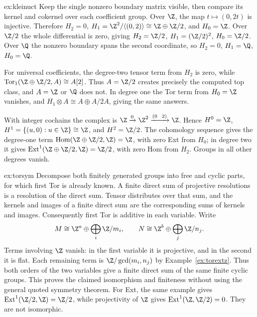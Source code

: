 \begin{solution}{ex:kleinuct}
\idea Keep the single nonzero boundary matrix visible, then compare its kernel and cokernel over each coefficient group.
\writeup Over $\Z$, the map $t\mapsto(0,2t)$ is injective. Therefore
$H_2=0$, $H_1=\Z^2/\langle(0,2)\rangle\cong\Z\oplus\Z/2$, and $H_0=\Z$.
Over $\Z/2$ the whole differential is zero, giving $H_2=\Z/2$, $H_1=(\Z/2)^2$, $H_0=\Z/2$.
Over $\Q$ the nonzero boundary spans the second coordinate, so $H_2=0$, $H_1=\Q$, $H_0=\Q$.

For universal coefficients, the degree-two tensor term from $H_2$ is zero, while
$\operatorname{Tor}_1(\Z\oplus\Z/2,A)\cong A[2]$.
Thus $A=\Z/2$ creates precisely the computed top class, and $A=\Z$ or $\Q$ does not. In degree one the Tor term from $H_0=\Z$ vanishes, and
$H_1\otimes A\cong A\oplus A/2A$, giving the same answers.

With integer cochains the complex is
$\Z\xrightarrow0\Z^2\xrightarrow{(0\ \ 2)}\Z$.
Hence $H^0=\Z$, $H^1=\{(u,0):u\in\Z\}\cong\Z$, and $H^2=\Z/2$. The cohomology sequence gives the degree-one term
$\operatorname{Hom}(\Z\oplus\Z/2,\Z)=\Z$, with zero Ext from $H_0$; in degree two it gives
$\operatorname{Ext}^1(\Z\oplus\Z/2,\Z)=\Z/2$, with zero Hom from $H_2$. Groups in all other degrees vanish.
\end{solution}

\begin{solution}{ex:torsym}
\idea Decompose both finitely generated groups into free and cyclic parts, for which first Tor is already known.
\writeup A finite direct sum of projective resolutions is a resolution of the direct sum. Tensor distributes over that sum, and the kernels and images of a finite direct sum are the corresponding sums of kernels and images. Consequently first Tor is additive in each variable. Write
\[
M\cong\Z^a\oplus\bigoplus_i\Z/m_i,
\qquad N\cong\Z^b\oplus\bigoplus_j\Z/n_j.
\]
Terms involving $\Z$ vanish: in the first variable it is projective, and in the second it is flat. Each remaining term is $\Z/\gcd(m_i,n_j)$ by Example~\ref{ex:torextz}. Thus both orders of the two variables give a finite direct sum of the same finite cyclic groups. This proves the claimed isomorphism and finiteness without using the general quoted symmetry theorem.
For Ext, the same example gives $\operatorname{Ext}^1(\Z/2,\Z)=\Z/2$, while projectivity of $\Z$ gives $\operatorname{Ext}^1(\Z,\Z/2)=0$. They are not isomorphic.
\end{solution}

